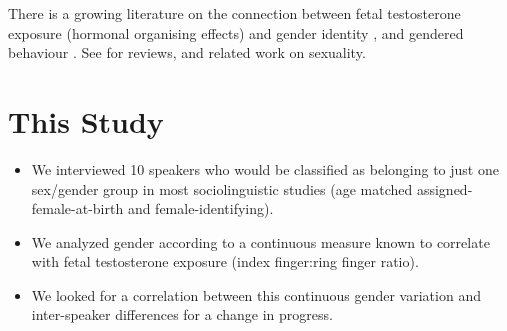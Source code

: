 \documentclass[a0,portrait]{a0poster}
\begin{document}
\begin{multicols}{2}
There is a growing literature on the connection between fetal testosterone exposure (hormonal organising effects) and gender identity \citep{hinesetal2004, berenbaumbailey2003}, and gendered behaviour \citep{hinesetal2002, auyeungetal2009}. See \citet{hines2006, balthazart2011} for reviews, and related work on sexuality.


%
%




\section*{This Study}

\begin{itemize}
	\item We interviewed 10 speakers who would be classified as belonging to just one sex/gender group in most sociolinguistic studies (age matched assigned-female-at-birth and female-identifying).
	\item We analyzed gender according to a continuous measure known to correlate with fetal testosterone exposure (index finger:ring finger ratio).
	\item We looked for a correlation between this continuous gender variation and inter-speaker differences for a change in progress.
\end{itemize}


\end{multicols}
\end{document}
